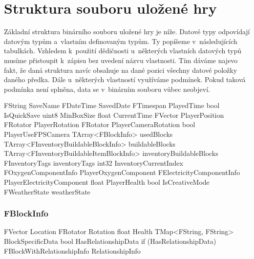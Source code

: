 \newpage

\section{Struktura souboru uložené hry}
\label{sec:saveGame}
Základní struktura binárního souboru uložené hry je níže. Datové typy odpovídají datovým typům \UEu{} a~vlastním definovaným typům. Ty popíšeme v~následujících tabulkách. Vzhledem k~použití dědičnosti u~některých vlastních datových typů musíme přistoupit k~zápisu  bez uvedení názvu vlastnosti. Tím dáváme najevo fakt, že daná struktura navíc obsahuje na dané pozici všechny datové položky daného předka. Dále u~některých vlastností využíváme podmínek. Pokud taková podmínka není splněna, data se v~binárním souboru vůbec neobjeví.

\begin{code}
FString                                     SaveName
FDateTime                                   SavedDate
FTimespan                                   PlayedTime
bool                                        IsQuickSave
uint8                                       MinBoxSize
float                                       CurrentTime
FVector                                     PlayerPosition
FRotator                                    PlayerRotation
FRotator                                    PlayerCameraRotation
bool                                        PlayerUseFPSCamera
TArray<FBlockInfo>                          usedBlocks
TArray<FInventoryBuildableBlockInfo>        buildableBlocks
TArray<FInventoryBuildableItemBlockInfo>    inventoryBuildableBlocks
FInventoryTags                              inventoryTags
int32                                       InventoryCurrentIndex
FOxygenComponentInfo                        PlayerOxygenComponent
FElectricityComponentInfo                   PlayerElectricityComponent
float                                       PlayerHealth
bool                                        IsCreativeMode
FWeatherState                               weatherState
\end{code}



\subsubsection{FBlockInfo}

\begin{code}
[FBlockBaseInfo]
FVector                                     Location
FRotator                                    Rotation
float                                       Health
TMap<FString, FString>                      BlockSpecificData
bool                                        HasRelationshipData
if (HasRelationshipData)
    FBlockWithRelationshipInfo              RelationshipInfo
\end{code}

